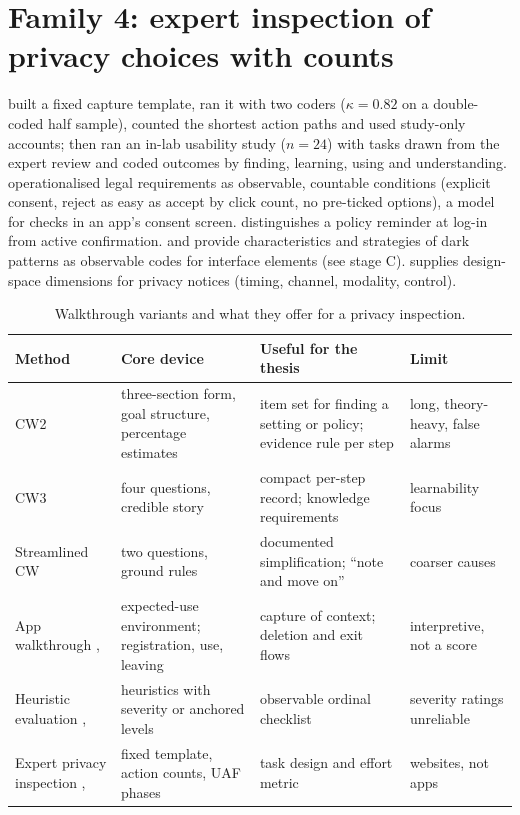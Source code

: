 \section{Family 4: expert inspection of privacy choices with counts}
 built a fixed capture template, ran it with two coders ($\kappa=0.82$ on a double-coded half sample), counted the shortest action paths and used study-only accounts;  then ran an in-lab usability study ($n=24$) with tasks drawn from the expert review and coded outcomes by finding, learning, using and understanding.  operationalised legal requirements as observable, countable conditions (explicit consent, reject as easy as accept by click count, no pre-ticked options), a model for checks in an app's consent screen.  distinguishes a policy reminder at log-in from active confirmation.  and  provide characteristics and strategies of dark patterns as observable codes for interface elements (see stage C).  supplies design-space dimensions for privacy notices (timing, channel, modality, control).

\begin{table}[t]
\centering\small
\caption{Walkthrough variants and what they offer for a privacy inspection.}
\label{tab:W-variants}
\begin{tabularx}{\textwidth}{@{}P{2.6cm}P{3.2cm}YY@{}}
\toprule
\textbf{Method} & \textbf{Core device} & \textbf{Useful for the thesis} & \textbf{Limit}\\
\midrule
CW2  & three-section form, goal structure, percentage estimates & item set for finding a setting or policy; evidence rule per step & long, theory-heavy, false alarms\\
CW3  & four questions, credible story & compact per-step record; knowledge requirements & learnability focus\\
Streamlined CW  & two questions, ground rules & documented simplification; ``note and move on'' & coarser causes\\
App walkthrough ,  & expected-use environment; registration, use, leaving & capture of context; deletion and exit flows & interpretive, not a score\\
Heuristic evaluation ,  & heuristics with severity or anchored levels & observable ordinal checklist & severity ratings unreliable\\
Expert privacy inspection ,  & fixed template, action counts, UAF phases & task design and effort metric & websites, not apps\\
\bottomrule
\end{tabularx}
\end{table}


